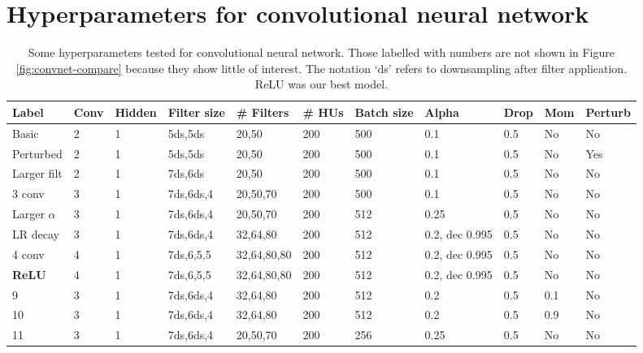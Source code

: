 \documentclass{acm_proc_article-sp}
\begin{document}
\section{Hyperparameters for convolutional neural network}
\label{sec:convnet-settings}
\begin{table}[h!]
  \centering
  \begin{tabular}{|l|l|l|l|l|l|l|l|l|l|l|}
  \hline
    {\bfseries Label} & {\bfseries Conv} & {\bfseries Hidden} & {\bfseries Filter size} & {\bfseries \# Filters} & {\bfseries \# HUs} & {\bfseries Batch size} & {\bfseries Alpha} & {\bfseries Drop} & {\bfseries Mom} & {\bfseries Perturb}\\
    \hline \hline
    Basic & 2 & 1 & 5ds,5ds & 20,50 & 200 & 500 & 0.1 & 0.5 & No & No\\
    \hline
    Perturbed & 2 & 1 & 5ds,5ds & 20,50 & 200 & 500 & 0.1 & 0.5 & No & Yes\\
    \hline
    Larger filt & 2 & 1 & 7ds,6ds & 20,50 & 200 & 500 & 0.1 & 0.5 & No & No\\
    \hline
    3 conv & 3 & 1 & 7ds,6ds,4 & 20,50,70 & 200 & 500 & 0.1 & 0.5 & No & No\\
    \hline
    Larger $\alpha$ & 3 & 1 & 7ds,6ds,4 & 20,50,70 & 200 & 512 & 0.25 & 0.5 & No & No\\
    \hline
    LR decay & 3 & 1 & 7ds,6ds,4 & 32,64,80 & 200 & 512 & 0.2, dec 0.995 & 0.5 & No & No\\
    \hline
    4 conv & 4 & 1 & 7ds,6,5,5 & 32,64,80,80 & 200 & 512 & 0.2, dec 0.995 & 0.5 & No & No\\
    \hline
    {\bfseries ReLU} & 4 & 1 & 7ds,6,5,5 & 32,64,80,80 & 200 & 512 & 0.2, dec 0.995 & 0.5 & No & No\\
    \hline
    9 & 3 & 1 & 7ds,6ds,4 & 32,64,80 & 200 & 512 & 0.2 & 0.5 & 0.1 & No\\
    \hline
    10 & 3 & 1 & 7ds,6ds,4 & 32,64,80 & 200 & 512 & 0.2 & 0.5 & 0.9 & No\\
    \hline
    11 & 3 & 1 & 7ds,6ds,4 & 20,50,70 & 200 & 256 & 0.25 & 0.5 & No & No\\
    \hline
  \end{tabular}
  \caption{Some hyperparameters tested for convolutional neural network. Those labelled with numbers are not shown in Figure \ref{fig:convnet-compare} because they show little of interest. The notation `ds' refers to downsampling after filter application. ReLU was our best model.}
  \label{tab:convnet-params}
\end{table}



\balancecolumns
\end{document}
